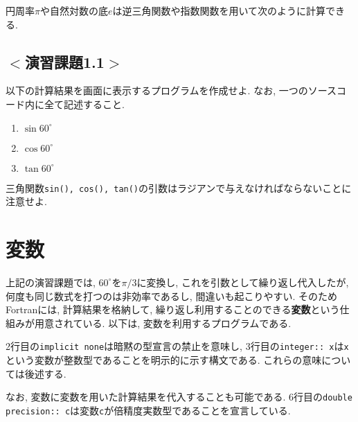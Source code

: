 円周率$\pi$や自然対数の底$e$は逆三角関数や指数関数を用いて次のように計算できる.



%


\subsection*{$<$演習課題1.1$>$}
以下の計算結果を画面に表示するプログラムを作成せよ. なお, 一つのソースコード内に全て記述すること. 
\begin{enumerate}
\item $\sin 60^\circ$
\item $\cos 60^\circ$
\item $\tan 60^\circ$
\end{enumerate}
三角関数\verb|sin(), cos(), tan()|の引数はラジアンで与えなければならないことに注意せよ.

\section{変数}
上記の演習課題では, $60^\circ$を$\pi/3$に変換し, これを引数として繰り返し代入したが, 
何度も同じ数式を打つのは非効率であるし, 間違いも起こりやすい. 
そのためFortranには, 計算結果を格納して, 繰り返し利用することのできる{\bfseries 変数}という仕組みが用意されている. 
以下は, 変数を利用するプログラムである. 

2行目の\verb|implicit none|は暗黙の型宣言の禁止を意味し, 
3行目の\verb|integer:: x|は\verb|x|という変数が整数型であることを明示的に示す構文である. 
これらの意味については後述する. 


なお, 変数に変数を用いた計算結果を代入することも可能である. 
6行目の\verb|double precision:: c|は変数\verb|c|が倍精度実数型であることを宣言している. 



